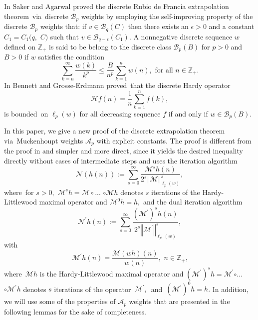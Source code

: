 \documentclass[a4paper]{amsart}
\theoremstyle{plain}
\numberwithin{equation}{section}
\begin{document}
In \cite{saker1} Saker and Agarwal proved the discrete Rubio de Francia
extrapolation theorem\ via\ discrete $\mathcal{B}_{p}$ weights by employing
the self-improving property of the discrete $\mathcal{B}_{p}$ weights that:
if $v\in \mathcal{B}_{q}(C)$ then there exists an $\epsilon >0$ and a
constant $C_{1}=C_{1}(q,$ $C)$ such that $v\in \mathcal{B}_{q-\epsilon
}(C_{1})$. A nonnegative discrete sequence $w$ defined on $\mathbb{Z}_{+}$
is said to be belong to the discrete class $\mathcal{B}_{p}(B)$ for $p>0$
and $B>0$ if $w$ satisfies the condition 
\begin{equation}
\sum_{k=n}^{\infty }\frac{w(k)}{k^{p}}\leq \frac{B}{n^{p}}\sum_{k=1}^{n}w(n),%
\text{ \ for all }n\in \mathbb{Z}_{+}.  \label{B}
\end{equation}%
In \cite{Benet} Bennett and Grosse-Erdmann proved\ that the discrete Hardy
operator 
\begin{equation*}
\mathcal{H}f(n)=\frac{1}{n}\sum_{k=1}^{n}f(k),
\end{equation*}%
is bounded\ on $\ell _{p}(w)$ for all decreasing sequence $f$ if and only if 
$w\in \mathcal{B}_{p}(B).$

\bigskip

In this paper, we give a new proof of the discrete extrapolation theorem
via\ Muckenhoupt weights $\mathcal{A}_{p}$ with explicit constants$.$ The
proof is different from the proof in \cite{saker} and simpler and more
direct, since it yields the desired inequality directly without cases of
intermediate steps and uses the iteration algorithm 
\begin{equation*}
\mathcal{N}\left( h(n)\right) :=\sum_{s=0}^{\infty }\frac{\mathcal{M}^{s}h(n)%
}{2^{s}\left\Vert \mathcal{M}\right\Vert _{\ell _{p}(w)}^{s}},
\end{equation*}%
where\ for $s>0,$ $\mathcal{M}^{s}h=\mathcal{M\circ }...$ $\mathcal{\circ M}%
h $ denotes $s$ iterations of the Hardy-Littlewood maximal operator and $%
\mathcal{M}^{0}h=h,$ and the dual iteration algorithm 
\begin{equation}
\mathcal{N}^{\prime }h(n):=\sum_{s=0}^{\infty }\frac{\left( \mathcal{M}%
^{\prime }\right) ^{s}h(n)}{2^{s}\left\Vert \mathcal{M}^{\prime }\right\Vert
_{\ell _{p^{\prime }}(w)}^{s}},
\end{equation}%
with%
\begin{equation}
\mathcal{M}^{\prime }h(n)=\frac{\mathcal{M}\left( wh\right) (n)}{w(n)},\text{
\ }n\in \mathbb{Z}_{+}\text{,}
\end{equation}%
where\ $\mathcal{M}h$ is the Hardy-Littlewood maximal operator and $\left( 
\mathcal{M}^{\prime }\right) ^{s}h=\mathcal{M}^{\prime }\mathcal{\circ }...$ 
$\mathcal{\circ M}^{\prime }h$ denotes $s$ iterations of the operator\ $%
\mathcal{M}^{\prime },$\ and\ $\left( \mathcal{M}^{\prime }\right) ^{0}h=h.$
In addition, we will use some of the properties of $\mathcal{A}_{p}$ weights
that are presented in the following lemmas for the sake of completeness.
\end{document}
